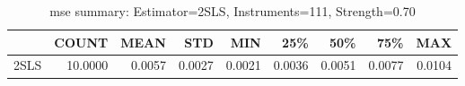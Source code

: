 \begin{table}[ht]
\centering
\caption{mse summary: Estimator=2SLS, Instruments=111, Strength=0.70}
\begin{tabular}{lrrrrrrrr}
\toprule
 & COUNT & MEAN & STD & MIN & 25\% & 50\% & 75\% & MAX \\
\midrule
2SLS & 10.0000 & 0.0057 & 0.0027 & 0.0021 & 0.0036 & 0.0051 & 0.0077 & 0.0104 \\
\bottomrule
\end{tabular}
\end{table}
